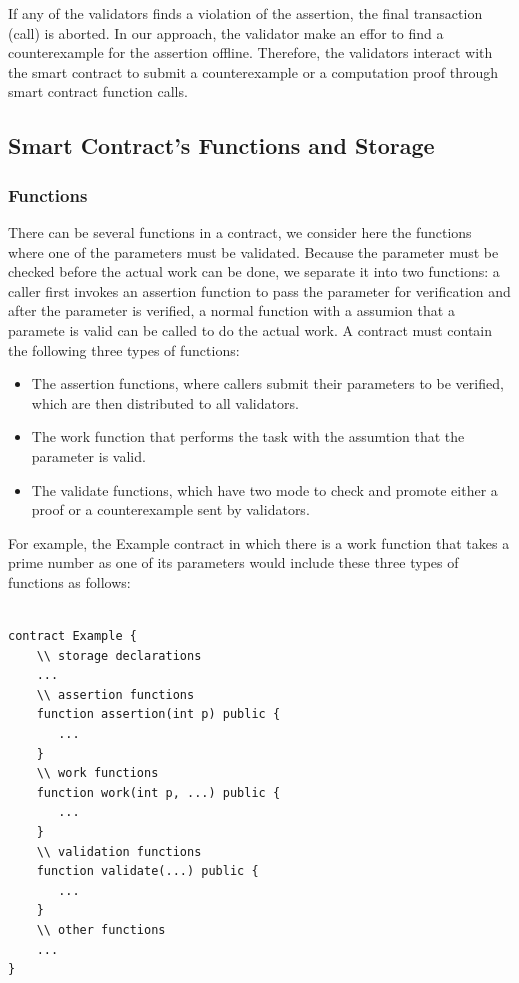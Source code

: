 \documentclass[runningheads]{llncs}
\begin{document}
If any of the validators finds a violation of the assertion, the final transaction (call) is aborted. In our approach, the validator make an effor to find a counterexample for the assertion offline. Therefore, the validators interact with the smart contract to submit a  counterexample or a computation proof through smart contract function calls. 
\subsection{Smart Contract's Functions and Storage}
\subsubsection{Functions}
There can be several functions in a contract, we consider here the functions where one of the parameters must be validated. Because the parameter must be checked before the actual work can be done, we separate it into two functions: a caller first invokes an assertion function to pass the parameter for  verification and after the parameter is verified, a normal function with a assumion that a paramete is valid can be called to do the actual work.  A contract must contain the following three types of functions:  

\begin{itemize}
\item The assertion functions, where callers submit their parameters to be verified, which are then distributed to all validators. 
\item  The work function that performs the task with the assumtion that the parameter is valid. 
\item The validate functions, which have two mode to check and promote either a proof or a counterexample sent by validators.
\end{itemize}

For example, the Example contract in which there is a work function that  takes a prime number as one of its parameters would include these three types of functions  as follows:

\begin{lstlisting}[numbers=none]

contract Example {
    \\ storage declarations
    ...
    \\ assertion functions
    function assertion(int p) public {
       ...
    } 
    \\ work functions
    function work(int p, ...) public {
       ...
    }
    \\ validation functions   
    function validate(...) public {
       ...
    }
    \\ other functions
    ...
}
\end{lstlisting}
\end{document}
